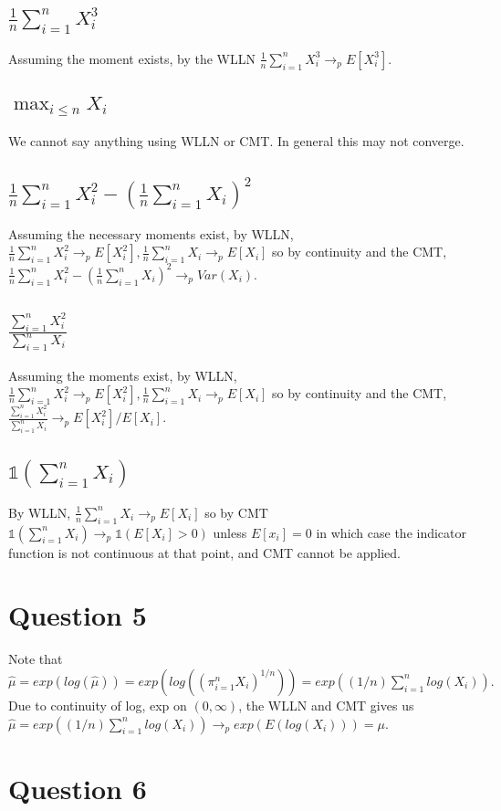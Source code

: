\documentclass[11pt]{article} %
\begin{document}
\subsection{$\frac{1}{n}\sum_{i=1}^n X_i^3$}
Assuming the moment exists, by the WLLN $\frac{1}{n}\sum_{i=1}^n X_i^3 \rightarrow_p E[X_i^3]$.
\subsection{$\max_{i\leq n}X_i$ }
We cannot say anything using WLLN or CMT. In general this may not converge.
\subsection{$\frac{1}{n}\sum_{i=1}^n X_i^2 - (\frac{1}{n}\sum_{i=1}^n X_i)^2$}
Assuming the necessary moments exist, by WLLN, $\frac{1}{n}\sum_{i=1}^n X_i^2 \rightarrow_p E[X_i^2], \frac{1}{n}\sum_{i=1}^n X_i \rightarrow_p E[X_i]$ so by continuity and the CMT, $\frac{1}{n}\sum_{i=1}^n X_i^2 - (\frac{1}{n}\sum_{i=1}^n X_i)^2 \rightarrow_p Var(X_i)$.
\subsection{$\frac{\sum_{i=1}^n X_i^2 }{\sum_{i=1}^n X_i }$}
Assuming the moments exist, by WLLN, $\frac{1}{n}\sum_{i=1}^n X_i^2 \rightarrow_p E[X_i^2], \frac{1}{n}\sum_{i=1}^n X_i \rightarrow_p E[X_i]$ so by continuity and the CMT,  $\frac{\sum_{i=1}^n X_i^2 }{\sum_{i=1}^n X_i }\rightarrow_p E[X_i^2]/E[X_i]. $
\subsection{$\mathbb{1}(\sum_{i=1}^n X_i )$}
By WLLN, $ \frac{1}{n}\sum_{i=1}^n X_i \rightarrow_p E[X_i]$ so by CMT $\mathbb{1}(\sum_{i=1}^n X_i ) \rightarrow_p \mathbb{1}(E[X_i]>0) $ unless $E[x_i]=0$ in which case the indicator function is not continuous at that point, and CMT cannot be applied.
\section{Question 5}
Note that $\hat{\mu} = exp(log(\hat{\mu})) = exp(log((\pi_{i=1}^n X_i)^{1/n})) = exp((1/n)\sum_{i=1}^nlog(X_i)).$ Due to continuity of log, exp on $(0,\infty)$, the WLLN and CMT gives us $\hat{\mu} =  exp((1/n)\sum_{i=1}^nlog(X_i)) \rightarrow_p exp(E(log(X_i))) = \mu$.
\section{Question 6}
\end{document}
